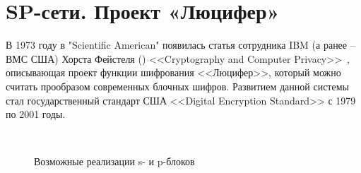 \section{SP-сети. Проект «Люцифер»}\label{section-project-lucifer}

В 1973 году в \foreignlanguage{english}{"Scientific American"} появилась статья сотрудника IBM (а ранее -- ВМС США) Хорста Фейстеля () <<Cryptography and Computer Privacy>>~\cite{Feistel:1973}, описывающая проект функции шифрования <<Люцифер>>, который можно считать прообразом современных блочных шифров. Развитием данной системы стал государственный стандарт США <<Digital Encryption Standard>> с 1979 по 2001 годы.

\begin{figure}[!t]
    \centering
    ~~~
		\caption{Возможные реализации s- и p-блоков}
\end{figure}

